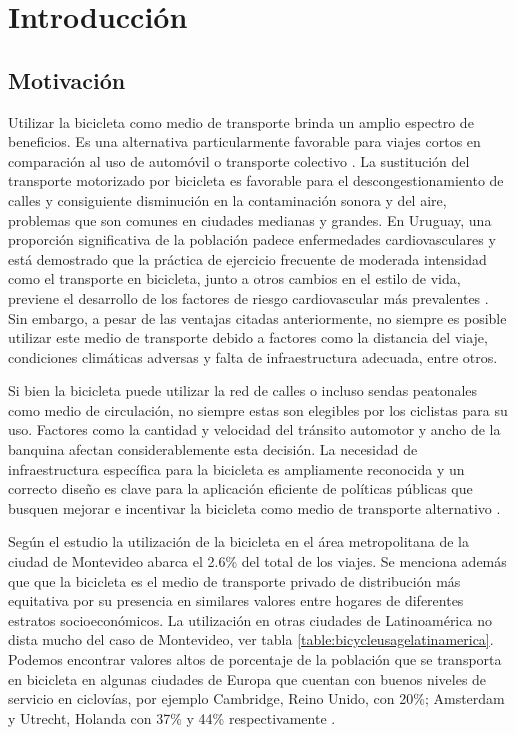 \documentclass{article}
\begin{document}
  \section{Introducción}

  \subsection{Motivación}

  Utilizar la bicicleta como medio de transporte brinda un amplio espectro de beneficios. Es una alternativa particularmente favorable para viajes cortos en comparación al uso de automóvil o transporte colectivo \cite{Hull2014}. La sustitución del transporte motorizado por bicicleta es favorable para el descongestionamiento de calles y consiguiente disminución en la contaminación sonora y del aire, problemas que son comunes en ciudades medianas y grandes. En Uruguay, una proporción significativa de la población padece enfermedades cardiovasculares y está demostrado que la práctica de ejercicio frecuente de moderada intensidad como el transporte en bicicleta, junto a otros cambios en el estilo de vida, previene el desarrollo de los factores de riesgo cardiovascular más prevalentes \cite{heartrisksuy} \cite{mspphisicalactivityguid} \cite{mspsurveyriskfactors}. Sin embargo, a pesar de las ventajas citadas anteriormente, no siempre es posible utilizar este medio de transporte debido a factores como la distancia del viaje, condiciones climáticas adversas y falta de infraestructura adecuada, entre otros.

  Si bien la bicicleta puede utilizar la red de calles o incluso sendas peatonales como medio de circulación, no siempre estas son elegibles por los ciclistas para su uso. Factores como la cantidad y velocidad del tránsito automotor y ancho de la banquina afectan considerablemente esta decisión. La necesidad de infraestructura específica para la bicicleta es ampliamente reconocida y un correcto diseño es clave para la aplicación eficiente de políticas públicas que busquen mejorar e incentivar la bicicleta como medio de transporte alternativo \cite{hunt2007}.

  Según el estudio \cite{Mauttone2017a} la utilización de la bicicleta en el área metropolitana de la ciudad de Montevideo abarca el 2.6\% del total de los viajes. Se menciona además que que la bicicleta es el medio de transporte privado de distribución más equitativa por su presencia en similares valores entre hogares de diferentes estratos socioeconómicos. La utilización en otras ciudades de Latinoamérica no dista mucho del caso de Montevideo, ver tabla \ref{table:bicycleusagelatinamerica}. Podemos encontrar valores altos de porcentaje de la población que se transporta en bicicleta en algunas ciudades de Europa que cuentan con buenos niveles de servicio en ciclovías, por ejemplo Cambridge, Reino Unido, con 20\%; Amsterdam y Utrecht, Holanda con 37\% y 44\% respectivamente \cite{Hull2014}.
\end{document}
